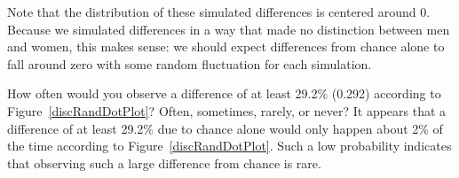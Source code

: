 Note that the distribution of these simulated differences is centered around 0. Because we simulated differences in a way that made no distinction between men and women, this makes sense: we should expect differences from chance alone to fall around zero with some random fluctuation for each simulation.

\begin{example}{How often would you observe a difference of at least 29.2\% (0.292) according to Figure~\ref{discRandDotPlot}? Often, sometimes, rarely, or never?}
It appears that a difference of at least 29.2\% due to chance alone would only happen about 2\% of the time according to Figure~\ref{discRandDotPlot}. Such a low probability indicates that observing such a large difference from chance is rare.
\end{example}

